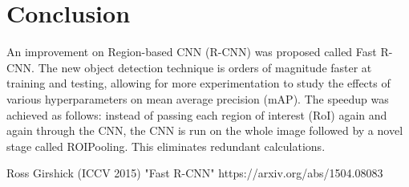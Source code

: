 \documentclass[10pt]{article}
\begin{document}
\section{Conclusion}
An improvement on Region-based CNN (R-CNN) was proposed called Fast R-CNN. The new object detection technique is orders of magnitude faster at training and testing, allowing for more experimentation to study the effects of various hyperparameters on mean average precision (mAP). The speedup was achieved as follows: instead of passing each region of interest (RoI) again and again through the CNN, the CNN is run on the whole image followed by a novel stage called ROIPooling. This eliminates redundant calculations.


\begin{thebibliography}{9}

Ross Girshick (ICCV 2015) "Fast R-CNN" https://arxiv.org/abs/1504.08083

\end{thebibliography}
\end{document}
